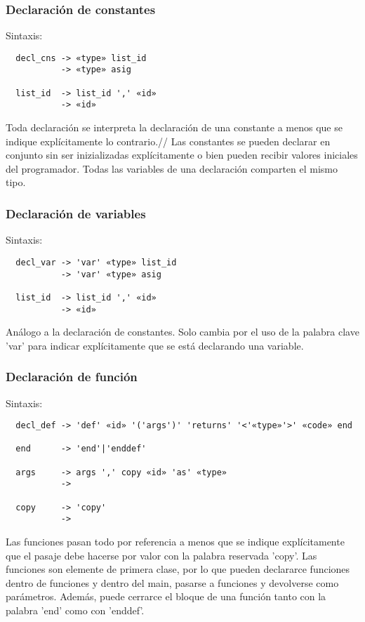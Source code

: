 \documentclass[12pt, spanish]{report}
\begin{document}
\subsubsection{Declaraci\'on de constantes}
Sintaxis:
\begin{verbatim}
  decl_cns -> «type» list_id 
           -> «type» asig

  list_id  -> list_id ',' «id»
           -> «id»
\end{verbatim}

Toda declaración se interpreta la declaración de una constante a
menos que se indique explícitamente lo contrario.// 
Las constantes se pueden declarar en conjunto sin ser inizializadas
explícitamente o bien pueden recibir valores iniciales del
programador. Todas las variables de una declaración comparten el
mismo tipo.

\subsubsection{Declaraci\'on de variables}
Sintaxis:
\begin{verbatim}
  decl_var -> 'var' «type» list_id 
           -> 'var' «type» asig

  list_id  -> list_id ',' «id»
           -> «id»
\end{verbatim}

Análogo a la declaración de constantes. Solo cambia por el uso de
la palabra clave 'var' para indicar explícitamente que se está
declarando una variable.

\subsubsection{Declaraci\'on de funci\'on}
Sintaxis:
\begin{verbatim}
  decl_def -> 'def' «id» '('args')' 'returns' '<'«type»'>' «code» end

  end      -> 'end'|'enddef'

  args     -> args ',' copy «id» 'as' «type»
           -> 
   
  copy     -> 'copy'
           ->
\end{verbatim}

Las funciones pasan todo por referencia a menos que se indique
explícitamente que el pasaje debe hacerse por valor con la palabra
reservada 'copy'. Las funciones son elemente de primera clase, por lo
que pueden declararce funciones dentro de funciones y dentro del main,
pasarse a funciones y devolverse como parámetros. Adem\'as, puede cerrarce el bloque de una funci\'on tanto con la palabra 'end' como con 'enddef'.
\end{document}
